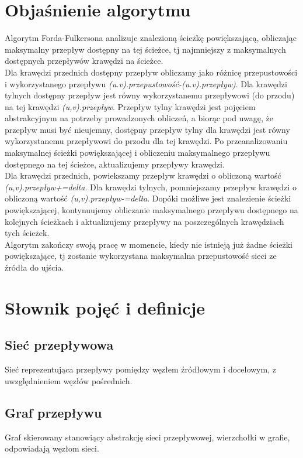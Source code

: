 \documentclass[10pt]{minutes}
\begin{document}
\section{Objaśnienie algorytmu}
Algorytm Forda-Fulkersona analizuje znalezioną ścieżkę powiększającą, obliczając maksymalny przepływ dostępny na tej ścieżce, tj najmniejszy z maksymalnych dostępnych przepływów krawędzi na ścieżce.\\
Dla krawędzi przednich dostępny przepływ obliczamy jako różnicę przepustowości i wykorzystanego przepływu \emph{(u.v).przepustowość-(u.v).przepływ)}. Dla krawędzi tylnych dostępny przepływ jest równy wykorzystanemu przepływowi (do przodu) na tej krawędzi \emph{(u,v).przepływ}. Przepływ tylny krawędzi jest pojęciem abstrakcyjnym na potrzeby prowadzonych obliczeń, a biorąc pod uwagę, że przepływ musi być nieujemny, dostępny przepływ tylny dla krawędzi jest równy wykorzystanemu przepływowi do przodu dla tej krawędzi.
Po przeanalizowaniu maksymalnej ścieżki powiększającej i obliczeniu maksymalnego przepływu dostępnego na tej ścieżce, aktualizujemy przepływy krawędzi.\\
Dla krawędzi przednich, powiekszamy przepływ krawędzi o obliczoną wartość \emph{(u,v).przepływ+=delta}. Dla krawędzi tylnych, pomniejszamy przepływ krawędzi o obliczoną wartość \emph{(u,v).przepływ-=delta}.
Dopóki możliwe jest znalezienie ścieżki powiększającej, kontynuujemy obliczanie maksymalnego przepływu dostępnego na kolejnych ścieżkach i aktualizujemy przepływy na poszczególnych krawędziach tych ścieżek.\\
Algorytm zakończy swoją pracę w momencie, kiedy nie istnieją już żadne ścieżki powiększające, tj zostanie wykorzystana maksymalna przepustowość sieci ze źródła do ujścia.


\section{Słownik pojęć i definicje}
\subsection{Sieć przepływowa}
Sieć reprezentująca przepływy pomiędzy węzłem źródłowym i docelowym, z uwzględnieniem węzłów pośrednich.
\subsection{Graf przepływu}
Graf skierowany stanowiący abstrakcję sieci przepływowej, wierzchołki w grafie, odpowiadają węzłom sieci.
\end{document}
